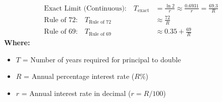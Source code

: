 \begin{formulabox}
\begin{align*}
    \text{Exact Limit (Continuous):} \quad T_{\text{exact}} &= \frac{\ln 2}{r} \approx \frac{0.6931}{r} = \frac{69.3}{R} \\[4pt]
    \text{Rule of 72:} \quad T_{\text{Rule of 72}} &\approx \frac{72}{R} \\[4pt]
    \text{Rule of 69:} \quad T_{\text{Rule of 69}} &\approx 0.35 + \frac{69}{R}
\end{align*}
\textbf{Where:}
\begin{itemize}[noitemsep, topsep=2pt]
    \item $T$ = Number of years required for principal to double
    \item $R$ = Annual percentage interest rate ($R\%$)
    \item $r$ = Annual interest rate in decimal ($r = R/100$)
\end{itemize}
\end{formulabox}

